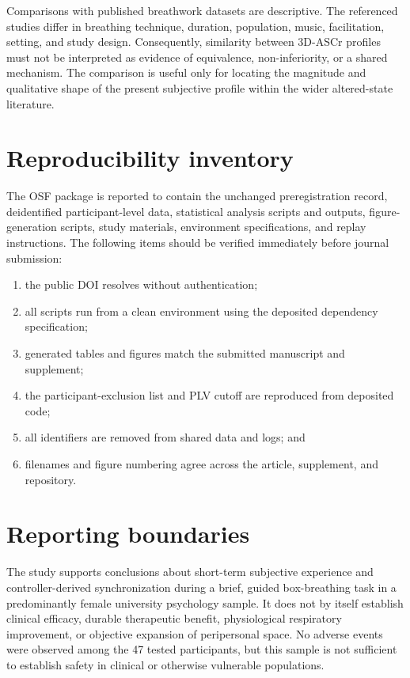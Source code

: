 \documentclass[pdflatex,sn-mathphys-num]{sn-jnl}
\begin{document}
Comparisons with published breathwork datasets are descriptive. The referenced studies differ in breathing technique, duration, population, music, facilitation, setting, and study design. Consequently, similarity between 3D-ASCr profiles must not be interpreted as evidence of equivalence, non-inferiority, or a shared mechanism. The comparison is useful only for locating the magnitude and qualitative shape of the present subjective profile within the wider altered-state literature.

\section{Reproducibility inventory}

The OSF package is reported to contain the unchanged preregistration record, deidentified participant-level data, statistical analysis scripts and outputs, figure-generation scripts, study materials, environment specifications, and replay instructions. The following items should be verified immediately before journal submission:

\begin{enumerate}
\item the public DOI resolves without authentication;
\item all scripts run from a clean environment using the deposited dependency specification;
\item generated tables and figures match the submitted manuscript and supplement;
\item the participant-exclusion list and PLV cutoff are reproduced from deposited code;
\item all identifiers are removed from shared data and logs; and
\item filenames and figure numbering agree across the article, supplement, and repository.
\end{enumerate}

\section{Reporting boundaries}

The study supports conclusions about short-term subjective experience and controller-derived synchronization during a brief, guided box-breathing task in a predominantly female university psychology sample. It does not by itself establish clinical efficacy, durable therapeutic benefit, physiological respiratory improvement, or objective expansion of peripersonal space. No adverse events were observed among the 47 tested participants, but this sample is not sufficient to establish safety in clinical or otherwise vulnerable populations.


\end{document}
